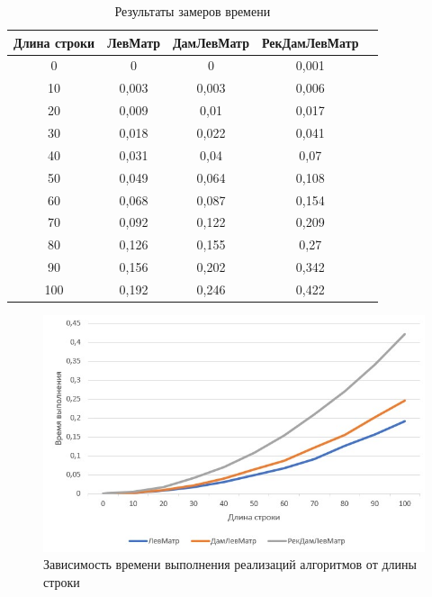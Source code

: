 \begin{table}[H]
	\begin{center}
		\caption{\label{tab:time}Результаты замеров времени}
		\begin{tabular}{|c|c|c|c|c|}
			\hline
Длина строки&ЛевМатр&ДамЛевМатр&РекДамЛевМатр \\
\hline
0&	0&	0&	0,001\\
\hline
10&	0,003&	0,003&	0,006\\
\hline
20&	0,009&	0,01&	0,017\\
\hline
30&	0,018&	0,022&	0,041\\
\hline
40&	0,031&	0,04&	0,07\\
\hline
50&	0,049&	0,064&	0,108\\
\hline
60&	0,068&	0,087&	0,154\\
\hline
70&	0,092&	0,122&	0,209\\
\hline
80&	0,126&	0,155&	0,27\\
\hline
90&	0,156&	0,202&	0,342\\
\hline
100&	0,192&	0,246&	0,422\\
\hline
		\end{tabular}
	\end{center}
\end{table}
\begin{figure}[H]
	\centering
	\includegraphics[width=0.7\linewidth]{"inc/img/Снимок экрана 2022-10-22 154429"}
	\caption{Зависимость времени выполнения реализаций алгоритмов от длины строки}
	\label{fig:--2022-09-25-200448}
\end{figure}
